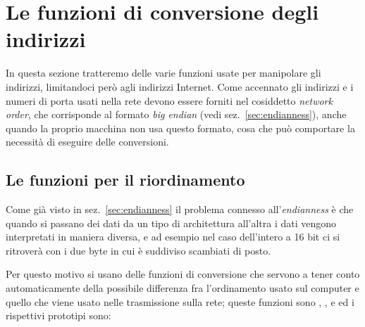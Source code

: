 





\section{Le funzioni di conversione degli indirizzi}
\label{sec:sock_addr_func}

In questa sezione tratteremo delle varie funzioni usate per manipolare gli
indirizzi, limitandoci però agli indirizzi Internet.  Come accennato gli
indirizzi e i numeri di porta usati nella rete devono essere forniti nel
cosiddetto \textit{network order}, che corrisponde al formato \textit{big
  endian} (vedi sez.~\ref{sec:endianness}), anche quando la proprio macchina
non usa questo formato, cosa che può comportare la necessità di eseguire delle
conversioni.


\subsection{Le funzioni per il riordinamento}
\label{sec:sock_func_ord}

Come già visto in sez.~\ref{sec:endianness} il problema connesso
all'\textit{endianness} è che quando si passano dei dati da un tipo di
architettura all'altra i dati vengono interpretati in maniera diversa, e ad
esempio nel caso dell'intero a 16 bit ci si ritroverà con i due byte in cui è
suddiviso scambiati di posto.  

Per questo motivo si usano delle funzioni di conversione che servono a tener
conto automaticamente della possibile differenza fra l'ordinamento usato sul
computer e quello che viene usato nelle trasmissione sulla rete; queste
funzioni sono , ,  e  ed i
rispettivi prototipi sono:


